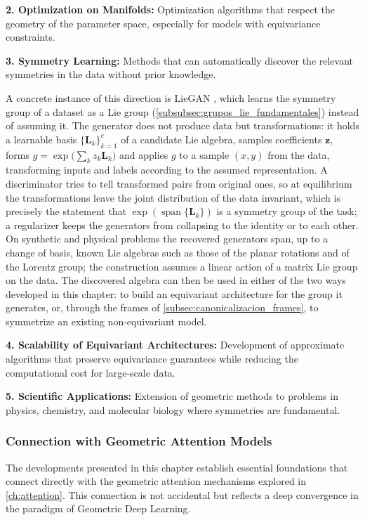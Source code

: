 \textbf{2. Optimization on Manifolds:} Optimization algorithms that respect the geometry of the parameter space, especially for models with equivariance constraints.

\textbf{3. Symmetry Learning:} Methods that can automatically discover the relevant symmetries in the data without prior knowledge.

A concrete instance of this direction is LieGAN \citep{yang2023liegan}, which learns the symmetry group of a dataset as a Lie group (\autoref{subsubsec:grupos_lie_fundamentales}) instead of assuming it. The generator does not produce data but transformations: it holds a learnable basis $\{\mathbf{L}_k\}_{k=1}^{c}$ of a candidate Lie algebra, samples coefficients $\mathbf{z}$, forms $g = \exp\big(\sum_k z_k \mathbf{L}_k\big)$ and applies $g$ to a sample $(x, y)$ from the data, transforming inputs and labels according to the assumed representation. A discriminator tries to tell transformed pairs from original ones, so at equilibrium the transformations leave the joint distribution of the data invariant, which is precisely the statement that $\exp(\operatorname{span}\{\mathbf{L}_k\})$ is a symmetry group of the task; a regularizer keeps the generators from collapsing to the identity or to each other. On synthetic and physical problems the recovered generators span, up to a change of basis, known Lie algebras such as those of the planar rotations and of the Lorentz group; the construction assumes a linear action of a matrix Lie group on the data. The discovered algebra can then be used in either of the two ways developed in this chapter: to build an equivariant architecture for the group it generates, or, through the frames of \autoref{subsec:canonicalizacion_frames}, to symmetrize an existing non-equivariant model.

\textbf{4. Scalability of Equivariant Architectures:} Development of approximate algorithms that preserve equivariance guarantees while reducing the computational cost for large-scale data.

\textbf{5. Scientific Applications:} Extension of geometric methods to problems in physics, chemistry, and molecular biology where symmetries are fundamental.

\subsubsection{Connection with Geometric Attention Models}

The developments presented in this chapter establish essential foundations that connect directly with the geometric attention mechanisms explored in \autoref{ch:attention}. This connection is not accidental but reflects a deep convergence in the paradigm of Geometric Deep Learning.

